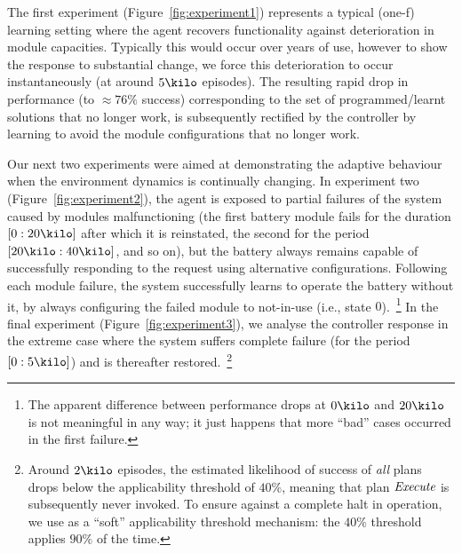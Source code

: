 %
The first experiment (Figure~\ref{fig:experiment1}) represents a typical (one-f) learning setting where the agent recovers functionality against deterioration in module capacities. Typically this would occur over years of use, however to show the response to substantial change, we force this deterioration to occur instantaneously (at around $5\kilo$ episodes). The resulting rapid drop in performance (to $\approx 76\%$ success) corresponding to the set of programmed/learnt solutions that no longer work, is subsequently rectified by the controller by learning to avoid the module configurations that no longer work. 

Our next two experiments were aimed at demonstrating the adaptive behaviour when the environment dynamics is continually changing.
%
In experiment two (Figure~\ref{fig:experiment2}), the agent is exposed to partial failures of the system caused by modules malfunctioning (the first battery module fails for the duration $[0:20\kilo]$ after which it is reinstated, the second for the period $[20\kilo:40\kilo]$, and so on), but the battery always remains capable of successfully responding to the request using alternative configurations. Following each module failure, the system successfully learns to operate the battery without it, by always configuring the failed module to not-in-use (i.e., state $0$).~\footnote{The apparent difference between performance drops at $0\kilo$ and $20\kilo$ is not meaningful in any way; it just happens that more ``bad'' cases occurred in the first failure.} 
%
In the final experiment (Figure~\ref{fig:experiment3}), we analyse the controller response in the extreme case where the system suffers complete failure (for the period $[0:5\kilo]$) and is thereafter restored.~\footnote{Around $2\kilo$ episodes, the estimated likelihood of success of {\em all} plans drops below the applicability threshold of $40\%$, meaning that plan $\operatorname{\textit{Execute}}$ is subsequently never invoked. To ensure against a complete halt in operation, we use as a ``soft'' applicability threshold mechanism: the $40\%$ threshold applies $90\%$ of the time.}
